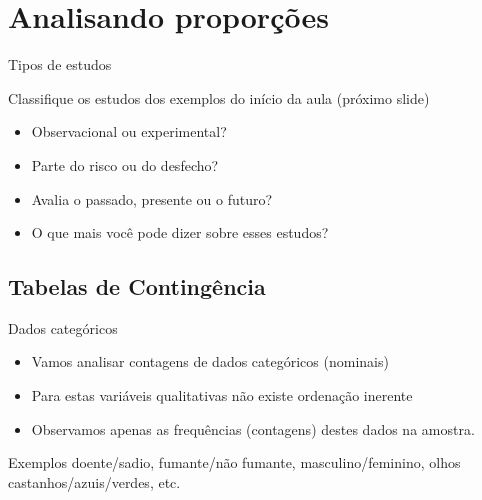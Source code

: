 \documentclass{beamer}
\begin{document}
\section{Analisando proporções}

\begin{frame}{\scriptsize Tipos de estudos}
  \begin{block}{}
    \footnotesize
    Classifique os estudos dos exemplos do início da aula (próximo slide)

    \bigskip
    \begin{itemize}
      \footnotesize
    \item Observacional ou experimental?
    \item Parte do risco ou do desfecho?
    \item Avalia o passado, presente ou o futuro?
    \item O que mais você pode dizer sobre esses estudos?
    \end{itemize}
  \end{block}
\end{frame}



\subsection{Tabelas de Contingência}

\begin{frame}{\scriptsize Dados categóricos}
  \begin{itemize}
    \footnotesize
  \item Vamos analisar contagens de dados categóricos (nominais)
  \item Para estas variáveis qualitativas não existe ordenação inerente
  \item Observamos apenas as frequências (contagens) destes dados na amostra.
  \end{itemize}
  \begin{exampleblock}{Exemplos}
    \footnotesize
    doente/sadio, fumante/não fumante, masculino/feminino, olhos
    castanhos/azuis/verdes, etc.
  \end{exampleblock}
\end{frame}
\end{document}
